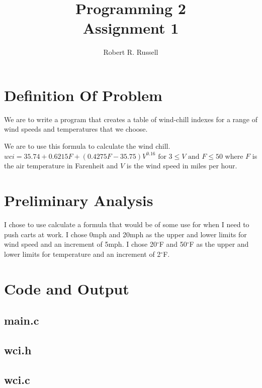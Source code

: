 \documentclass[letterpaper,10pt,oneside]{scrartcl}
\title{Programming 2\\Assignment 1}
\author{Robert R. Russell}
\begin{document}
\maketitle

\section{Definition Of Problem}
We are to write a program that creates a table of wind-chill indexes
for a range of wind speeds and temperatures that we choose.

We are to use this formula to calculate the wind chill.
\begin{math}
  wci = 35.74+0.6215F+(0.4275F-35.75)V^{0.16}\text{ for }3\leq{}V\text{ and }F\leq{}50
\end{math}
where $F$ is the air temperature in Farenheit and
$V$ is the wind speed in miles per hour.

\section{Preliminary Analysis}
I chose to use calculate a formula that would be of some use for when
I need to push carts at work. I chose 0mph and 20mph as the upper and
lower limits for wind speed and an increment of 5mph. I chose 20$^{\circ}$F and
50$^{\circ}$F as the upper and lower limits for temperature and an increment of 2$^{\circ}$F.

\newpage
\section{Code and Output}
\subsection{main.c}
\newpage
\subsection{wci.h}
\newpage
\subsection{wci.c}
\newpage
\end{document}

